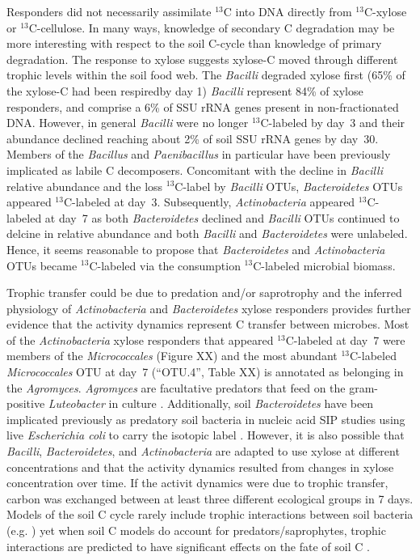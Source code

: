 Responders did not necessarily assimilate $^{13}$C into DNA directly
from $^{13}$C-xylose or $^{13}$C-cellulose. In many ways, knowledge of
secondary C degradation may be more interesting with respect to the soil
C-cycle than knowledge of primary degradation. The response to
xylose suggests xylose-C moved through different trophic levels within the soil
food web. The \textit{Bacilli} degraded xylose first (65\% of the xylose-C had
been respiredby day 1) \textit{Bacilli} represent 84\% of xylose responders,
and comprise a 6\% of SSU rRNA genes present in non-fractionated DNA. However,
in general \textit{Bacilli} were no longer $^{13}$C-labeled by day~3 and their
abundance declined reaching about 2\% of soil SSU rRNA genes by day~30. Members
of the \textit{Bacillus} \citep{Cleveland2007} and \textit{Paenibacillus} in
particular \citep{Verastegui_2014} have been previously implicated as labile
C decomposers. Concomitant with the decline in \textit{Bacilli} relative
abundance and the loss $^{13}$C-label by \textit{Bacilli} OTUs,
\textit{Bacteroidetes} OTUs appeared $^{13}$C-labeled at day~3. Subsequently,
\textit{Actinobacteria} appeared $^{13}$C-labeled at day~7 as both
\textit{Bacteroidetes} declined and \textit{Bacilli} OTUs continued to delcine
in relative abundance and both \textit{Bacilli} and \textit{Bacteroidetes} were
unlabeled. Hence, it seems reasonable to propose that \textit{Bacteroidetes}
and \textit{Actinobacteria} OTUs became $^{13}$C-labeled via the consumption
$^{13}$C-labeled microbial biomass. 

Trophic transfer could be due to predation and/or saprotrophy and the inferred
physiology of \textit{Actinobacteria} and \textit{Bacteroidetes} xylose
responders provides further evidence that the activity dynamics represent 
C transfer between microbes. Most of the \textit{Actinobacteria} xylose
responders that appeared $^{13}$C-labeled at day~7 were members of the
\textit{Micrococcales} (Figure XX) and the most abundant $^{13}$C-labeled
\textit{Micrococcales} OTU at day~7 (“OTU.4”, Table XX) is annotated as
belonging in the \textit{Agromyces}. \textit{Agromyces} are facultative
predators that feed on the gram-positive \textit{Luteobacter} in culture
\citep{16346402}. Additionally, soil \textit{Bacteroidetes} have been
implicated previously as predatory soil bacteria in nucleic acid SIP studies
using live \textit{Escherichia coli} to carry the isotopic label
\citep{Lueders2006}. However, it is also possible that \textit{Bacilli},
\textit{Bacteroidetes}, and \textit{Actinobacteria} are adapted to use xylose
at different concentrations and that the activity dynamics resulted from
changes in xylose concentration over time. If the activit dynamics were due to
trophic transfer, carbon was exchanged between at least three different
ecological groups in 7 days. Models of the soil C cycle rarely include trophic
interactions between soil bacteria (e.g. \citep{Moore1988}) yet when soil
C models do account for predators/saprophytes, trophic interactions are
predicted to have significant effects on the fate of soil
C \citep{Kaiser2014a}. 

